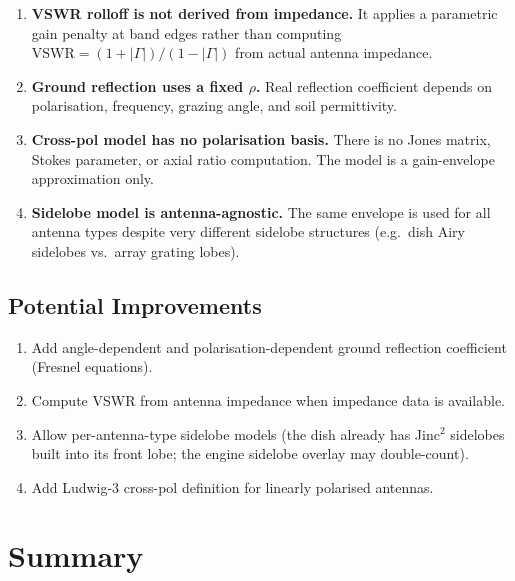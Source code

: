 \documentclass[11pt,a4paper]{article}
\begin{document}
\begin{enumerate}[nosep]
    \item \textbf{VSWR rolloff is not derived from impedance.} It applies a parametric gain penalty at band edges rather than computing $\text{VSWR} = (1 + |\Gamma|) / (1 - |\Gamma|)$ from actual antenna impedance.
    \item \textbf{Ground reflection uses a fixed $\rho$.} Real reflection coefficient depends on polarisation, frequency, grazing angle, and soil permittivity.
    \item \textbf{Cross-pol model has no polarisation basis.} There is no Jones matrix, Stokes parameter, or axial ratio computation. The model is a gain-envelope approximation only.
    \item \textbf{Sidelobe model is antenna-agnostic.} The same envelope is used for all antenna types despite very different sidelobe structures (e.g.\ dish Airy sidelobes vs.\ array grating lobes).
\end{enumerate}

\subsection{Potential Improvements}

\begin{enumerate}[nosep]
    \item Add angle-dependent and polarisation-dependent ground reflection coefficient (Fresnel equations).
    \item Compute VSWR from antenna impedance when impedance data is available.
    \item Allow per-antenna-type sidelobe models (the dish already has Jinc$^2$ sidelobes built into its front lobe; the engine sidelobe overlay may double-count).
    \item Add Ludwig-3 cross-pol definition for linearly polarised antennas.
\end{enumerate}


\newpage
\section{Summary}
\end{document}
